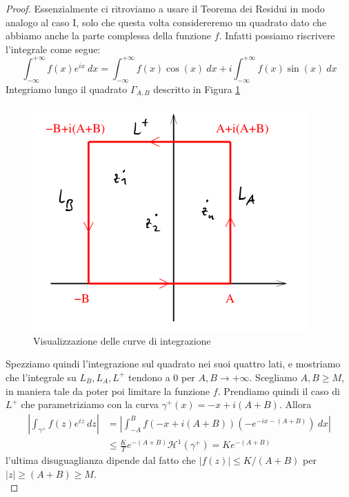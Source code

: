 \begin{proof}
    Essenzialmente ci ritroviamo a usare il Teorema dei Residui in modo analogo
    al caso I, solo che questa volta considereremo un quadrato dato che abbiamo
    anche la parte complessa della funzione $f$. Infatti possiamo riscrivere
    l'integrale come segue:
    \begin{equation*}
      \int_{-\infty}^{+\infty} f(x) e^{ix}\ dx = \int_{-\infty}^{+\infty}
      f(x)\cos(x) \ dx + i\int_{-\infty}^{+\infty} f(x)\sin(x)\ dx
    \end{equation*}
    Integriamo lungo il quadrato $\Gamma_{A,B}$ descritto in 
    Figura \ref{fig:residui_funz_fourier}
    
    \begin{figure}[h]
      \centering
      \includegraphics[width=0.4\linewidth]{images/analisi_complessa/residui_figura_2.png}
      \caption{Visualizzazione delle curve di integrazione}
      \label{fig:residui_funz_fourier}
    \end{figure}

    Spezziamo quindi l'integrazione sul quadrato nei suoi quattro lati,
    e mostriamo che l'integrale su $L_B, L_A, L^+$ tendono a $0$ per $A,B \to
    +\infty$. Scegliamo $A,B \ge M$, in maniera tale da poter poi limitare la
    funzione $f$. Prendiamo quindi il caso di $L^+$ che parametriziamo con la 
    curva $\gamma^+(x) = -x + i(A+B)$. Allora
    \begin{align*}
      \left| \int_{\gamma^+} f(z)e^{iz}\ dz  \right| & = \left| \int_{-A}^B f(-x
      + i(A+B)) (-e^{-ix - (A+B)})\ dx\right| \\
        & \le \frac{K}{T}e^{-(A+B)} \mathcal{H}^1(\gamma^+) = Ke^{-(A+B)}
    \end{align*}
    l'ultima disuguaglianza dipende dal fatto che $|f(z)| \le K/(A+B)$ per $|z| \ge
    (A+B) \ge M$. \\


\end{proof}
